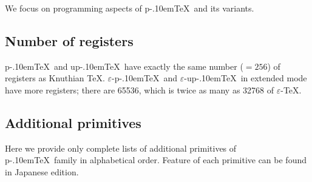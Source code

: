 \documentclass[a4paper,11pt]{article}
\def\epTeX{$\varepsilon$-\pTeX}\def\eTeX{$\varepsilon$-\TeX}
\def\eupTeX{$\varepsilon$-\upTeX}\def\upTeX{u\pTeX}
\def\pTeX{p\kern-.10em\TeX}
\begin{document}
We focus on programming aspects of \pTeX\ and its variants.

\subsection{Number of registers}

\pTeX\ and \upTeX\ have exactly the same number ($=256$) of registers
as Knuthian \TeX.
\epTeX\ and \eupTeX\ in extended mode have more registers;
there are 65536, which is twice as many as 32768 of \eTeX.


\subsection{Additional primitives}

Here we provide only complete lists of additional primitives
of \pTeX\ family in alphabetical order.
Feature of each primitive can be found in Japanese edition.


\def\New#1{--- New primitive since #1}

\end{document}
